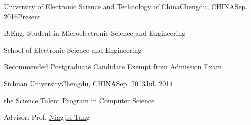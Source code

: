 
\begin{eduitem}{University of Electronic Science and Technology of China}{Chengdu, CHINA}{Sep. 2016}{Present}
\item B.Eng. Student in Microelectronic Science and Engineering
\item School of Electronic Science and Engineering
\item Recommended Postgraduate Candidate Exempt from Admission Exam
\end{eduitem}

\begin{eduitem}{Sichuan University}{Chengdu, CHINA}{Sep. 2013}{Jul. 2014}
\item \href{http://ycjh.org}{the Science Talent Program} in Computer Science 
\item Advisor: Prof. \href{http://cs.scu.edu.cn/info/1074/3930.htm}{Ningjiu Tang}
\end{eduitem}

\endinput
